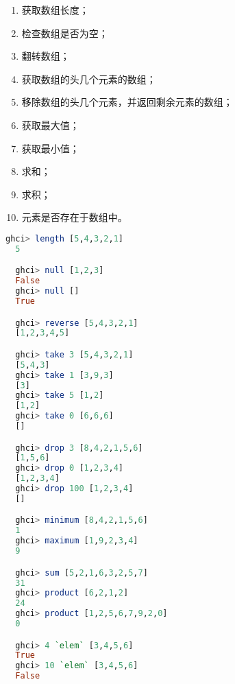 \documentclass[./main.tex]{subfiles}
\begin{document}
\begin{enumerate}
  \item {} 获取数组长度；
  \item {} 检查数组是否为空；
  \item {} 翻转数组；
  \item {} 获取数组的头几个元素的数组；
  \item {} 移除数组的头几个元素，并返回剩余元素的数组；
  \item {} 获取最大值；
  \item {} 获取最小值；
  \item {} 求和；
  \item {} 求积；
  \item {} 元素是否存在于数组中。
\end{enumerate}

\begin{lstlisting}[language=Haskell]
  ghci> length [5,4,3,2,1]
  5

  ghci> null [1,2,3]
  False
  ghci> null []
  True

  ghci> reverse [5,4,3,2,1]
  [1,2,3,4,5]

  ghci> take 3 [5,4,3,2,1]
  [5,4,3]
  ghci> take 1 [3,9,3]
  [3]
  ghci> take 5 [1,2]
  [1,2]
  ghci> take 0 [6,6,6]
  []

  ghci> drop 3 [8,4,2,1,5,6]
  [1,5,6]
  ghci> drop 0 [1,2,3,4]
  [1,2,3,4]
  ghci> drop 100 [1,2,3,4]
  []

  ghci> minimum [8,4,2,1,5,6]
  1
  ghci> maximum [1,9,2,3,4]
  9

  ghci> sum [5,2,1,6,3,2,5,7]
  31
  ghci> product [6,2,1,2]
  24
  ghci> product [1,2,5,6,7,9,2,0]
  0

  ghci> 4 `elem` [3,4,5,6]
  True
  ghci> 10 `elem` [3,4,5,6]
  False
\end{lstlisting}
\end{document}
